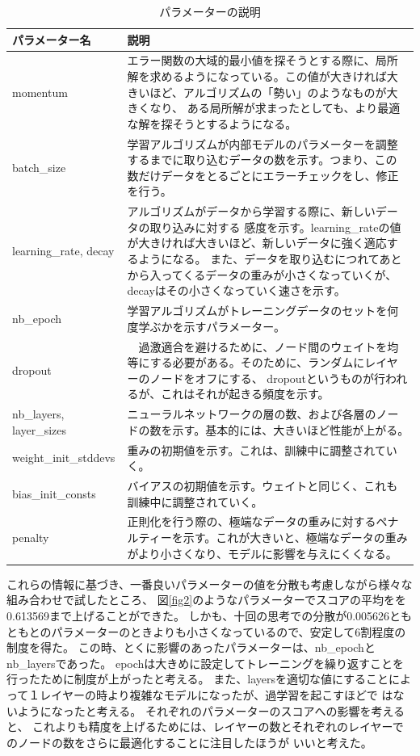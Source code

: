 \documentclass[a4j,11pt]{jarticle}
\begin{document}
\begin{table}[htb]
	\begin{tabular}{|l||p{10cm}|} \hline
		パラメーター名        & 説明　\\ \hline \hline
		momentum             &
エラー関数の大域的最小値を探そうとする際に、局所解を求めるようになっている。この値が大きければ大きいほど、アルゴリズムの「勢い」のようなものが大きくなり、
ある局所解が求まったとしても、より最適な解を探そうとするようになる。\cite{momentum} \\ \hline
		batch\_size           &
学習アルゴリズムが内部モデルのパラメーターを調整するまでに取り込むデータの数を示す。つまり、この数だけデータをとるごとにエラーチェックをし、修正を行う。\cite{epoch_batch}
 \\ \hline
		learning\_rate, decay &
アルゴリズムがデータから学習する際に、新しいデータの取り込みに対する
感度を示す。learning\_rateの値が大きければ大きいほど、新しいデータに強く適応するようになる。
また、データを取り込むにつれてあとから入ってくるデータの重みが小さくなっていくが、decayはその小さくなっていく速さを示す。\cite{lrd} \\ \hline
		nb\_epoch	     &
学習アルゴリズムがトレーニングデータのセットを何度学ぶかを示すパラメーター。\cite{epoch_batch}
\\ \hline
		dropout              &　過激適合を避けるために、ノード間のウェイトを均等にする必要がある。そのために、ランダムにレイヤーのノードをオフにする、
dropoutというものが行われるが、これはそれが起きる頻度を示す。\cite{dropout} \\ \hline
		nb\_layers, layer\_sizes &
ニューラルネットワークの層の数、および各層のノードの数を示す。基本的には、大きいほど性能が上がる。　\cite{layernode} \\ \hline
		weight\_init\_stddevs  &
重みの初期値を示す。これは、訓練中に調整されていく。\cite{bs} \\ \hline
		bias\_init\_consts     &
バイアスの初期値を示す。ウェイトと同じく、これも訓練中に調整されていく。\cite{bs} \\ \hline
		penalty              &
正則化を行う際の、極端なデータの重みに対するペナルティーを示す。これが大きいと、極端なデータの重みがより小さくなり、モデルに影響を与えにくくなる。\cite{regularization} \\ \hline
	\end{tabular}
	\caption{パラメーターの説明}
	\label{parameter}
\end{table}

これらの情報に基づき、一番良いパラメーターの値を分散も考慮しながら様々な組み合わせで試したところ、
図\ref{fig2}のようなパラメーターでスコアの平均をを0.613569まで上げることができた。
しかも、十回の思考での分散が0.005626ともともとのパラメーターのときよりも小さくなっているので、安定して6割程度の制度を得た。
この時、とくに影響のあったパラメーターは、nb\_epochとnb\_layersであった。
epochは大きめに設定してトレーニングを繰り返すことを行ったために制度が上がったと考える。
また、layersを適切な値にすることによって１レイヤーの時より複雑なモデルになったが、過学習を起こすほどで
はないようになったと考える。
それぞれのパラメーターのスコアへの影響を考えると、
これよりも精度を上げるためには、レイヤーの数とそれぞれのレイヤーでのノードの数をさらに最適化することに注目したほうが
いいと考えた。
\end{document}

